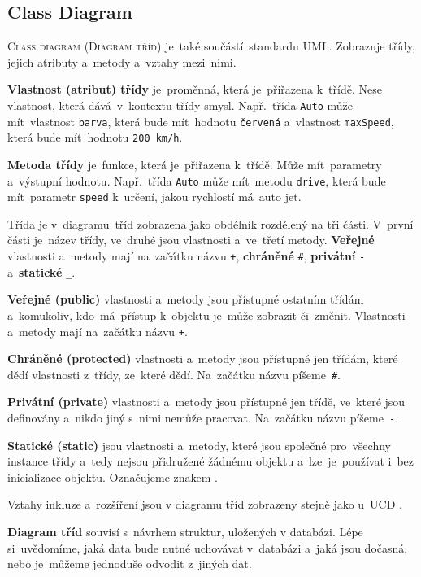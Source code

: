 \documentclass[14pt,a4paper]{article}
\begin{document}
        \subsection{Class Diagram}
        \textsc{Class diagram} (\textsc{Diagram tříd}) je~také součástí~standardu \textsc{UML}. Zobrazuje třídy, jejich atributy a~metody a~vztahy mezi~nimi.

        \textbf{Vlastnost (atribut) třídy} je~proměnná, která je~přiřazena k~třídě. Nese vlastnost, která dává~v~kontextu třídy smysl. Např.~třída \texttt{Auto} může mít~vlastnost \texttt{barva}, která bude mít~hodnotu \texttt{červená} a~vlastnost \texttt{maxSpeed}, která bude mít~hodnotu \texttt{200 km/h}.

        \textbf{Metoda třídy} je~funkce, která je~přiřazena k~třídě. Může mít~parametry a~výstupní hodnotu. Např.~třída \texttt{Auto} může mít~metodu \texttt{drive}, která bude mít~parametr \texttt{speed} k~určení, jakou rychlostí má~auto jet.
        
        Třída je v~diagramu~tříd zobrazena jako obdélník rozdělený na tři části. V~první části je~název třídy, ve~druhé jsou vlastnosti a~ve~třetí metody. \textbf{Veřejné} vlastnosti a~metody mají na~začátku názvu \texttt{+}, \textbf{chráněné} \texttt{\#}, \textbf{privátní} \texttt{-} a~\textbf{statické} \texttt{\_}.
        
        \textbf{Veřejné (public)} vlastnosti a~metody jsou přístupné ostatním třídám a~komukoliv, kdo~má~přístup k~objektu je~může zobrazit či~změnit. Vlastnosti a~metody mají na~začátku názvu \texttt{+}.

        \textbf{Chráněné (protected)} vlastnosti a~metody jsou přístupné jen třídám, které dědí vlastnosti z~třídy, ze~které dědí. Na~začátku názvu píšeme~\texttt{\#}.
        
        \textbf{Privátní (private)} vlastnosti a~metody jsou přístupné jen třídě, ve~které jsou definovány a~nikdo jiný s~nimi nemůže pracovat. Na~začátku názvu píšeme~\texttt{-}.
        
        \textbf{Statické (static)} jsou vlastnosti a~metody, které jsou společné pro~všechny instance třídy a~tedy nejsou přidružené žádnému objektu a~lze~je~používat i~bez inicializace objektu. Označujeme znakem \texttt{\textunderscore}.
        
        Vztahy inkluze a~rozšíření jsou v diagramu tříd zobrazeny stejně jako u~\textsc{UCD} \parencite{visualparadigmClassDiagram}.

        \textbf{Diagram tříd} souvisí s~návrhem struktur, uložených v databázi. Lépe si~uvědomíme, jaká data bude nutné uchovávat v~databázi a~jaká jsou dočasná, nebo je~můžeme jednoduše odvodit z~jiných dat.
\end{document}
